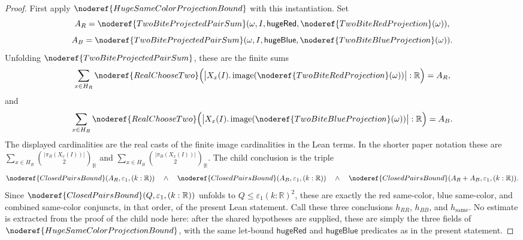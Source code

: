 \begin{proof}
First apply \(\noderef{HugeSameColorProjectionBound}\) with this
instantiation.  Set
\[
A_R=\noderef{TwoBiteProjectedPairSum}
  (\omega,I,\mathsf{hugeRed},\noderef{TwoBiteRedProjection}(\omega)),
\]
\[
A_B=\noderef{TwoBiteProjectedPairSum}
  (\omega,I,\mathsf{hugeBlue},\noderef{TwoBiteBlueProjection}(\omega)).
\]
Unfolding \(\noderef{TwoBiteProjectedPairSum}\), these are the finite sums
\[
\sum_{x\in H_R}\noderef{RealChooseTwo}
  \Bigl(\bigl|X_x(I).\operatorname{image}
    (\noderef{TwoBiteRedProjection}(\omega))\bigr|:\mathbb R\Bigr)=A_R,
\]
and
\[
\sum_{x\in H_B}\noderef{RealChooseTwo}
  \Bigl(\bigl|X_x(I).\operatorname{image}
    (\noderef{TwoBiteBlueProjection}(\omega))\bigr|:\mathbb R\Bigr)=A_B.
\]
The displayed cardinalities are the real casts of the finite image
cardinalities in the Lean terms.  In the shorter paper notation these are
\(\sum_{x\in H_R}\binom{|\pi_R(X_x(I))|}{2}_{\mathbb R}\) and
\(\sum_{x\in H_B}\binom{|\pi_B(X_x(I))|}{2}_{\mathbb R}\).
The child conclusion is the triple
\[
\noderef{ClosedPairsBound}(A_R,\varepsilon_1,(k:\mathbb R))
\quad\wedge\quad
\noderef{ClosedPairsBound}(A_B,\varepsilon_1,(k:\mathbb R))
\quad\wedge\quad
\noderef{ClosedPairsBound}(A_R+A_B,\varepsilon_1,(k:\mathbb R)).
\]
Since \(\noderef{ClosedPairsBound}(Q,\varepsilon_1,(k:\mathbb R))\) unfolds
to \(Q\le\varepsilon_1(k:\mathbb R)^2\), these are exactly the red
same-color, blue same-color, and combined same-color conjuncts, in that
order, of the present Lean statement.
Call these three conclusions \(h_{RR}\), \(h_{BB}\), and \(h_{\mathrm{same}}\).
No estimate is extracted from the proof of the child node here: after the
shared hypotheses are supplied, these are simply the three fields of
\(\noderef{HugeSameColorProjectionBound}\), with the same let-bound
\(\mathsf{hugeRed}\) and \(\mathsf{hugeBlue}\) predicates as in the present
statement.


\end{proof}

